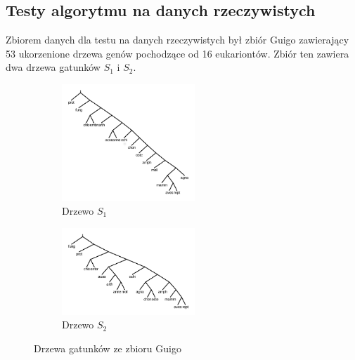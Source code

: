 \documentclass[licencjacka]{pracamgr}
\begin{document}
\subsection{Testy algorytmu na danych rzeczywistych}
Zbiorem danych dla testu na danych rzeczywistych był zbiór Guigo zawierający 53 ukorzenione drzewa genów pochodzące od 16 eukariontów. Zbiór ten zawiera dwa drzewa gatunków $S_1$ i $S_2$. \cite{guigo}

\begin{figure}[H]
\centering
\begin{subfigure}{.5\textwidth}
  \centering
  \includegraphics[width=50mm]{./pictures/guigo_spec_1.png}
  \caption{Drzewo $S_1$}
  \label{fig:sub2}
\end{subfigure}%
\begin{subfigure}{.5\textwidth}
  \centering
  \includegraphics[width=50mm]{./pictures/guigo_spec_2.png}
  \caption{Drzewo $S_2$}
  \label{fig:sub1}
\end{subfigure}%
\caption{Drzewa gatunków ze zbioru Guigo}
\label{fig:test}
\end{figure}
\end{document}
